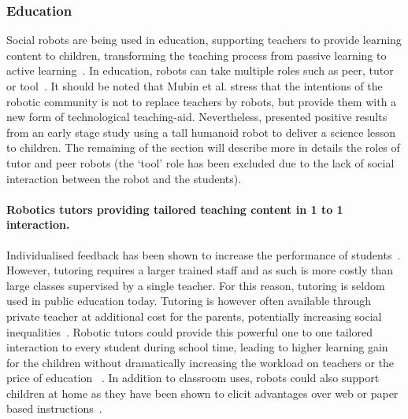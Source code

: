 \subsubsection{Education} 
	Social robots are being used in education, supporting teachers to provide learning content to children, transforming the teaching process from passive learning to active learning~\citep{linder2001facilitating}. In education, robots can take multiple roles such as peer, tutor or tool~\citep{mubin2013review}. It should be noted that Mubin et al. stress that the intentions of the robotic community is not to replace teachers by robots, but provide them with a new form of technological teaching-aid. Nevertheless, \cite{verner2016science} presented positive results from an early stage study using a tall humanoid robot to deliver a science lesson to children. The remaining of the section will describe more in details the roles of tutor and peer robots (the `tool' role has been excluded due to the lack of social interaction between the robot and the students). 
	
	\paragraph{Robotics tutors providing tailored teaching content in 1 to 1 interaction.} 
	Individualised feedback has been shown to increase the performance of students~\citep{cohen1982educational,bloom19842}. However, tutoring requires a larger trained staff and as such is more costly than large classes supervised by a single teacher. For this reason, tutoring is seldom used in public education today. Tutoring is however often available through private teacher at additional cost for the parents, potentially increasing social inequalities~\citep{bray2009confronting}. Robotic tutors could provide this powerful one to one tailored interaction to every student during school time, leading to higher learning gain for the children without dramatically increasing the workload on teachers or the price of education ~\citep{kanda2004interactive,leyzberg2012physical,kennedy2016social,gordon2016affective}. In addition to classroom uses, robots could also support children at home as they have been shown to elicit advantages over web or paper based instructions~\citep{han2005educational}. 
	
